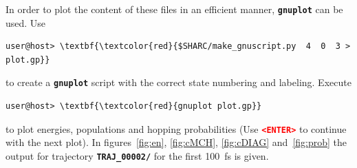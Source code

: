 \documentclass[a4paper,11pt,DIV=15,openany]{scrbook}
\newcommand{\ttt}[1]{\textbf{\texttt{#1}}}
\begin{document}
In order to plot the content of these files in an efficient manner, \ttt{gnuplot} can be used. Use
\begin{Verbatim}[commandchars=\\\{\}]
user@host> \textbf{\textcolor{red}{$SHARC/make_gnuscript.py  4  0  3 > plot.gp}}
\end{Verbatim}
to create a \ttt{gnuplot} script with the correct state numbering and labeling. Execute
\begin{Verbatim}[commandchars=\\\{\}]
user@host> \textbf{\textcolor{red}{gnuplot plot.gp}}
\end{Verbatim}
to plot energies, populations and hopping probabilities (Use \textcolor{red}{\ttt{<ENTER>}} to continue with the next plot). In figures~\ref{fig:en}, \ref{fig:cMCH}, \ref{fig:cDIAG} and~\ref{fig:prob} the output for trajectory \ttt{TRAJ\_00002/} for the first 100~fs is given.
\end{document}
